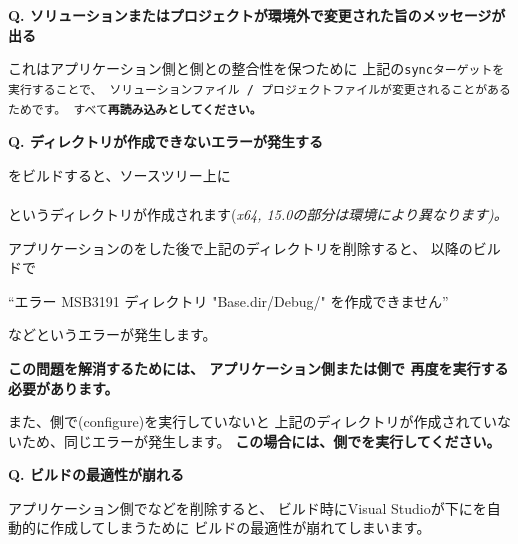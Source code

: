 \bf{Q. ソリューションまたはプロジェクトが環境外で変更された旨のメッセージが出る}

\medskip
これはアプリケーション側と\SprLib 側との整合性を保つために
上記の\tt{sync}ターゲットを実行することで、
ソリューションファイル / プロジェクトファイルが変更されることがあるためです。
すべて\bf{再読み込み}としてください。


\thinrule{\linewidth}

\bf{Q. ディレクトリが作成できないエラーが発生する}

\medskip
\SprLib をビルドすると、ソースツリー上に \\
\hspace{10pt} \\
というディレクトリが作成されます(\it{x64}, \it{15.0}の部分は環境により異なります)。

アプリケーションの\cmake をした後で上記のディレクトリを削除すると、
以降のビルドで

\hspace{20pt}``エラー MSB3191 ディレクトリ "Base.dir/Debug/" を作成できません''

などというエラーが発生します。

\bf{この問題を解消するためには、
アプリケーション側または\SprLib 側で 再度\cmake を実行する必要があります。}

また、\SprLib 側で\cmake (configure)を実行していないと 
上記のディレクトリが作成されていないため、同じエラーが発生します。
\bf{この場合には、\SprLib 側で\cmake を実行してください。}

\thinrule{\linewidth}

\bf{Q. ビルドの最適性が崩れる}
\label{subsec:QandA:CrumbleBuildOptimizeation}

\medskip
アプリケーション側でなどを削除すると、
ビルド時にVisual Studioが\BldDir 下にを自動的に作成してしまうために
ビルドの最適性が崩れてしまいます。

